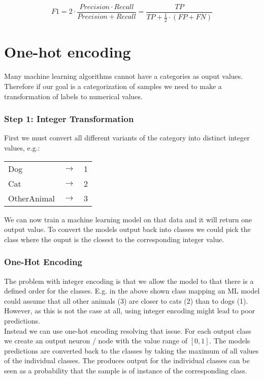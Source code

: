 $$
    F1 = 2 \cdot \frac{Precision \cdot Recall}{Precision + Recall} = \frac{TP}{TP + \frac{1}{2} \cdot (FP + FN)}
$$


\section{One-hot encoding}

Many machine learning algorithms cannot have a categories as ouput values. Therefore if our goal is a categorization of samples we need to make a transformation of labels to numerical values.

\subsubsection*{Step 1: Integer Transformation}
First we must convert all different variants of the category into distinct integer values, e.g.:\\

\begin{tabular}{l l l}
    Dog         & $\rightarrow$ & 1 \\
    Cat         & $\rightarrow$ & 2 \\
    OtherAnimal & $\rightarrow$ & 3 \\
\end{tabular}

We can now train a machine learning model on that data and it will return one output value. To convert the models output back into classes we could pick the class where the ouput is the closest to the corresponding integer value.

\subsubsection*{One-Hot Encoding}

The problem with integer encoding is that we allow the model to that there is a defined order for the classes. E.g. in the above shown class mapping an ML model could assume that all other animals (3) are closer to cats (2) than to dogs (1). However, as this is not the case at all, using integer encoding might lead to poor predictions.\\
Instead we can use one-hot encoding resolving that issue. For each output class we create an output neuron / node with the value range of $[0, 1]$. The models predictions are converted back to the classes by taking the maximum of all values of the individual classes. The produces output for the individual classes can be seen as a probability that the sample is of instance of the corresponding class.

